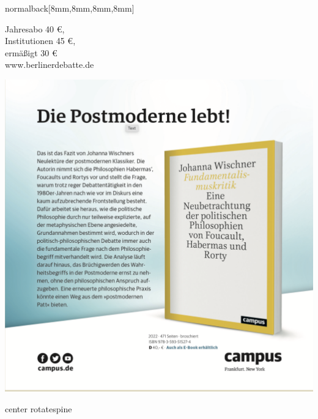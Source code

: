 \documentclass[
    coverwidth=160mm,
    coverheight=227mm,
    spinewidth=9mm,
    markcolor=black,
    marklength=8mm,
    trimmed=true,
    ]
    {bookcover}
\begin{document}
\begin{bookcover}
\begin{bookcoverelement}{normal}{back}[8mm,8mm,8mm,8mm]
{{\begin{minipage}[t]{72mm}
\begin{flushright}
{\begin{flushright}
                                    Jahresabo 40 €, \\
                                    Institutionen 45 €, \\
                                    ermäßigt 30 € \\
                                    www.berlinerdebatte.de
                                \end{flushright}
                                }
                        \end{flushright}
                    \end{minipage} 
                    \begin{center}
                        \includegraphics[scale=.4]{werbung-bdi.png}
                    \end{center}
                }
            }      
        \end{bookcoverelement}

        \begin{bookcoverelement}{center rotate}{spine}
            \bdispine \bdiTitle
            \hspace{9.5cm}
            \bdiReleaseTitle
        \end{bookcoverelement}
    \end{bookcover}
\end{document}

